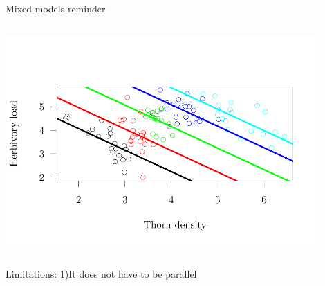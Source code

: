 \documentclass{beamer}
\begin{document}
\begin{frame}{Mixed models reminder}
\begin{columns}
\begin{column}{0.5\textwidth}
     \includegraphics[width=0.9\textwidth]{figure/graph2-1}
    \end{column}
\end{columns}

\end{frame}

\begin{frame}{Limitations: 1)It does not have to be parallel}
      
 
\end{frame}
\end{document}
